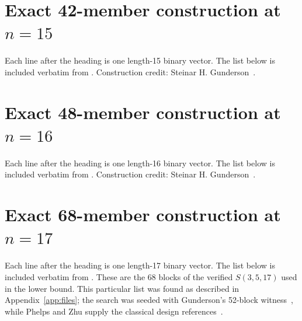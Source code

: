 \documentclass[11pt]{article}
\begin{document}
\clearpage
\section{Exact 42-member construction at $n=15$}\label{app:c15}

Each line after the heading is one length-15 binary vector.  The list below is
included verbatim from .  Construction credit:
Steinar H. Gunderson~\cite{gunderson-a286874}.


\clearpage
\section{Exact 48-member construction at $n=16$}\label{app:c16}

Each line after the heading is one length-16 binary vector.  The list below is
included verbatim from .  Construction credit:
Steinar H. Gunderson~\cite{gunderson-a286874}.


\clearpage
\section{Exact 68-member construction at $n=17$}\label{app:c17}

Each line after the heading is one length-17 binary vector.  The list below is
included verbatim from .  These are the 68
blocks of the verified $S(3,5,17)$ used in the lower bound.  This particular
list was found as described in Appendix~\ref{app:files}; the search was seeded
with Gunderson's 52-block
witness~\cite{gunderson-a286874}, while Phelps and Zhu supply the classical
design references~\cite{phelps1981,zhu1980}.




\end{document}
